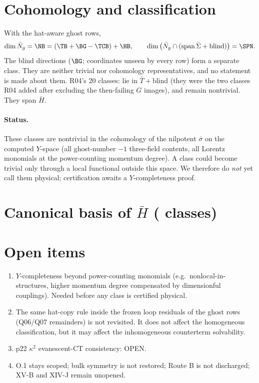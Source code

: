 \documentclass[11pt]{article}
\begin{document}
\section{Cohomology and classification}
With the hat-aware ghost rows,
\[ \dim\bar N_g=\NB=(\TB+\BG-\TCB)+\HB ,\qquad \dim\big(\bar N_g\cap(\operatorname{span}\bar\Sigma+\text{blind})\big)=\SPN . \]
The blind directions ($\BG$; coordinates unseen by every row) form a separate class. They are neither trivial nor cohomology
representatives, and no statement is made about them. R04's 20 classes: \TRT{} lie in $\bar T+$blind (they were the two
classes R04 added after excluding the then-failing $G$ images), and \TRN{} remain nontrivial. They span $\bar H$.
\paragraph{Status.} These \HB{} classes are nontrivial in the cohomology of the nilpotent $\bar\sigma$ on the computed
$Y$-space (all ghost-number $-1$ three-field contents, all Lorentz monomials at the power-counting momentum degree). A
class could become trivial only through a local functional outside this space. We therefore do \emph{not} yet call them
physical; certification awaits a $Y$-completeness proof.

\section{Canonical basis of $\bar H$ (\HB{} classes)}


\section{Open items}
\begin{enumerate}
\item $Y$-completeness beyond power-counting monomials (e.g.\ nonlocal-in-$\hat{}$ structures, higher momentum degree
      compensated by dimensionful couplings). Needed before any class is certified physical.
\item The same hat-copy rule inside the frozen loop residuals of the ghost rows (Q06/Q07 remainders) is not revisited. It
      does not affect the homogeneous classification, but it may affect the inhomogeneous counterterm solvability.
\item p22 $\kappa^2$ evanescent-CT consistency: OPEN.
\item O.1 stays scoped; bulk symmetry is not restored; Route B is not discharged; XV-B and XIV-J remain unopened.
\end{enumerate}
\end{document}
